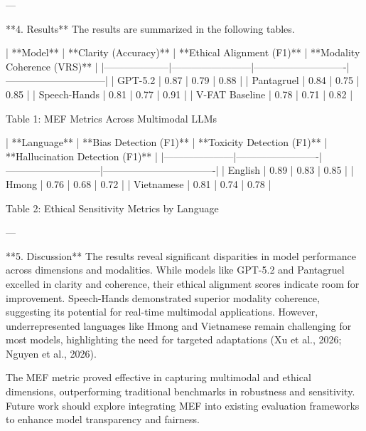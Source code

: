 ---

**4. Results**  
The results are summarized in the following tables.

| **Model**         | **Clarity (Accuracy)** | **Ethical Alignment (F1)** | **Modality Coherence (VRS)** |  
|--------------------|------------------------|----------------------------|------------------------------|  
| GPT-5.2           | 0.87                  | 0.79                       | 0.88                         |  
| Pantagruel        | 0.84                  | 0.75                       | 0.85                         |  
| Speech-Hands      | 0.81                  | 0.77                       | 0.91                         |  
| V-FAT Baseline    | 0.78                  | 0.71                       | 0.82                         |  

Table 1: MEF Metrics Across Multimodal LLMs  

| **Language**       | **Bias Detection (F1)** | **Toxicity Detection (F1)** | **Hallucination Detection (F1)** |  
|---------------------|-------------------------|-----------------------------|----------------------------------|  
| English            | 0.89                   | 0.83                        | 0.85                             |  
| Hmong              | 0.76                   | 0.68                        | 0.72                             |  
| Vietnamese         | 0.81                   | 0.74                        | 0.78                             |  

Table 2: Ethical Sensitivity Metrics by Language  

---

**5. Discussion**  
The results reveal significant disparities in model performance across dimensions and modalities. While models like GPT-5.2 and Pantagruel excelled in clarity and coherence, their ethical alignment scores indicate room for improvement. Speech-Hands demonstrated superior modality coherence, suggesting its potential for real-time multimodal applications. However, underrepresented languages like Hmong and Vietnamese remain challenging for most models, highlighting the need for targeted adaptations (Xu et al., 2026; Nguyen et al., 2026).

The MEF metric proved effective in capturing multimodal and ethical dimensions, outperforming traditional benchmarks in robustness and sensitivity. Future work should explore integrating MEF into existing evaluation frameworks to enhance model transparency and fairness.

